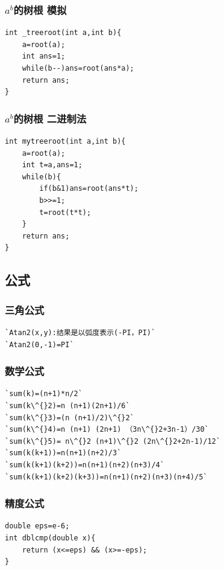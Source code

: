 \documentclass[a4paper]{article}
\begin{document}
\begin{CJK*}{UTF8}{gbsn}
\begin{multicols}{3}
\begin{flushleft}
\subsubsection{$a^b$的树根 模拟}
\begin{lstlisting}
int _treeroot(int a,int b){
	a=root(a);
	int ans=1;
	while(b--)ans=root(ans*a);
	return ans;
}
\end{lstlisting}

\subsubsection{$a^b$的树根 二进制法}
\begin{lstlisting}
int mytreeroot(int a,int b){
	a=root(a);
	int t=a,ans=1;
	while(b){
		if(b&1)ans=root(ans*t);
		b>>=1;
		t=root(t*t);
	}
	return ans;
}
\end{lstlisting}

\subsection{公式}

\subsubsection{三角公式}
\begin{lstlisting}
`Atan2(x,y):结果是以弧度表示(-PI，PI)`
`Atan2(0,-1)=PI`
\end{lstlisting}

\subsubsection{数学公式}
\begin{lstlisting}
`sum(k)=(n+1)*n/2`
`sum(k\^{}2)=n (n+1)(2n+1)/6`
`sum(k\^{}3)=(n (n+1)/2)\^{}2`
`sum(k\^{}4)=n (n+1) (2n+1) （3n\^{}2+3n-1）/30`
`sum(k\^{}5)= n\^{}2 (n+1)\^{}2 (2n\^{}2+2n-1)/12`
`sum(k(k+1))=n(n+1)(n+2)/3`
`sum(k(k+1)(k+2))=n(n+1)(n+2)(n+3)/4`
`sum(k(k+1)(k+2)(k+3))=n(n+1)(n+2)(n+3)(n+4)/5`
\end{lstlisting}

\subsubsection{精度公式}
\begin{lstlisting}
double eps=e-6;
int dblcmp(double x){
	return (x<=eps) && (x>=-eps);
}
\end{lstlisting}


\end{flushleft}
\end{multicols}
\end{CJK*}
\end{document}
